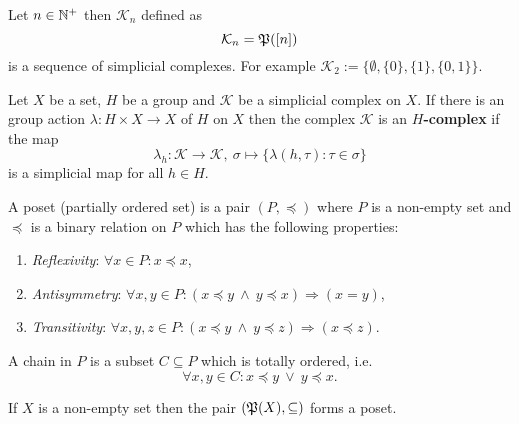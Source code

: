 \begin{ex}\label{ex:seqcom}
  Let $n \in \mathbb{N}^+$ then $\mathcal{K}_n$ defined as
  \begin{equation*}
    \mathcal{K}_n = \mathfrak{P}([n])
  \end{equation*}
  is a sequence of simplicial complexes. For example $\mathcal{K}_2 := \{\emptyset, \{0\}, \{1\}, \{0,1\}\}$.
\end{ex}

\begin{defin}
    Let $X$ be a set, $H$ be a group and $\mathcal{K}$ be a simplicial complex on $X$. If there is an 
    group action $\lambda \colon H \times X \to X$ of $H$ on $X$ then
    the complex $\mathcal{K}$ is an \textbf{$H$-complex} if the map
    \begin{equation*}
        \lambda_h \colon \mathcal{K} \to \mathcal{K}, \: \sigma \mapsto \{ \lambda(h, \tau)\colon \tau \in \sigma \}
    \end{equation*}
    is a simplicial map for all $h \in H$.
\end{defin}

\begin{defin}
    A poset (partially ordered set) is a pair $(P, \preceq)$ where 
    $P$ is a non-empty set and 
    $\preceq$ is a binary relation on $P$ which has the following properties:
    \begin{enumerate}
        \item \textit{Reflexivity}: $\forall x \in P\colon x \preceq x$,
        \item \textit{Antisymmetry}: $\forall x, y \in P\colon (x \preceq y \: \land \: y \preceq x) \Rightarrow (x = y)$,
        \item \textit{Transitivity}: $\forall x, y, z \in P\colon (x \preceq y \: \land \: y \preceq z) \Rightarrow (x \preceq z)$.
    \end{enumerate}
    A chain in $P$ is a subset $C \subseteq P$ which is totally ordered, i.e.
    \begin{equation*}
        \forall x, y \in C\colon x \preceq y \: \lor \: y \preceq x.
    \end{equation*}
\end{defin}

\begin{ex}
    If $X$ is a non-empty set then the pair $(\mathfrak{P}(X), \subseteq)$ forms a poset.
\end{ex}

